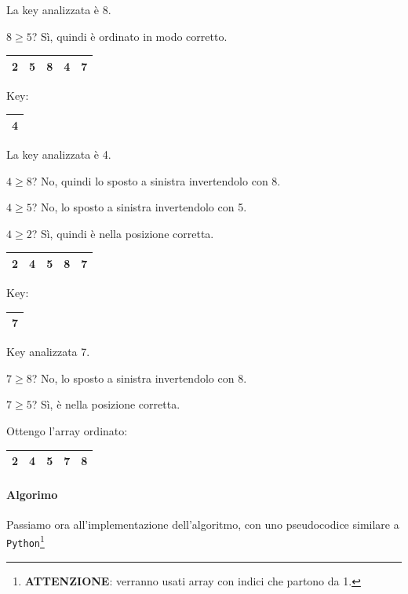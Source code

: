 La key analizzata è 8. \par
$8 \geq 5$? Sì, quindi è ordinato in modo corretto.

\begin{center}
	\begin{tabular}{|l|l|l|l|l|}
		\hline
		2 & 5 & 8 & 4 & 7 \\
		\hline
	\end{tabular}
	\hspace{1cm} Key: 
	\begin{tabular}{|l|}
		\hline
		4 \\
		\hline
	\end{tabular}
\end{center}

La key analizzata è 4.\par
$4 \geq 8$? No, quindi lo sposto a sinistra invertendolo con 8.\par 
$4 \geq 5$? No, lo sposto a sinistra invertendolo con 5.\par
$4 \geq 2$? Sì, quindi è nella posizione corretta.

\begin{center}
	\begin{tabular}{|l|l|l|l|l|}
		\hline
		2 & 4 & 5 & 8 & 7 \\
		\hline
	\end{tabular}
	\hspace{1cm} Key: 
	\begin{tabular}{|l|}
		\hline
		7 \\
		\hline
	\end{tabular}
\end{center}

Key analizzata 7. \par
$7 \geq 8$? No, lo sposto a sinistra invertendolo con 8.\par
$7 \geq 5$? Sì, è nella posizione corretta.\par
\smallskip
Ottengo l'array ordinato:

\begin{center}
	\begin{tabular}{|l|l|l|l|l|}
		\hline
		2 & 4 & 5 & 7 & 8 \\
		\hline
	\end{tabular}
\end{center}

\newpage

\paragraph{Algorimo} Passiamo ora all'implementazione dell'algoritmo, con uno pseudocodice similare a \texttt{Python}\footnote{\textbf{ATTENZIONE}: verranno usati array con indici
che partono da 1.}\par

